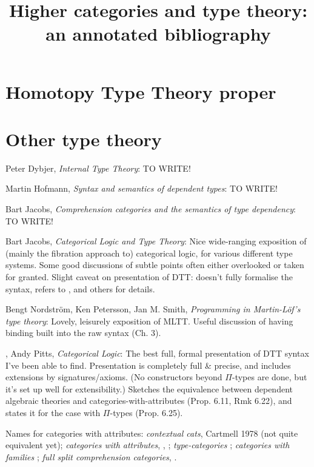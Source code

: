 \documentclass{article}
\begin{document}
\title{Higher categories and type theory: an annotated bibliography}

\section{Homotopy Type Theory proper}

\section{Other type theory}

\cite{dybjer:internal-type-theory} Peter Dybjer, \emph{Internal Type Theory}: TO WRITE!

\cite{hofmann:syntax-and-semantics} Martin Hofmann, \emph{Syntax and semantics of dependent types}: TO WRITE!

\cite{jacobs:comprehension-categories} Bart Jacobs, \emph{Comprehension categories and the semantics of type dependency}: TO WRITE!

\cite{jacobs:categorical-logic} Bart Jacobs, \emph{Categorical Logic and Type Theory}: Nice wide-ranging exposition of (mainly the fibration approach to) categorical logic, for various different type systems.  Some good discussions of subtle points often either overlooked or taken for granted.  Slight caveat on presentation of DTT: doesn't fully formalise the syntax, refers to \cite{pitts:categorical-logic}, \cite{hofmann:syntax-and-semantics} and others for details.

\cite{n-p-s:programming} Bengt Nordstr\"o{}m, Ken Petersson, Jan M. Smith, \emph{Programming in Martin-L\"o{}f's type theory}: Lovely, leisurely exposition of MLTT.  Useful discussion of having binding built into the raw syntax (Ch. 3).

\cite{pitts:categorical-logic}, Andy Pitts, \emph{Categorical Logic}: The best full, formal presentation of DTT syntax I've been able to find.  Presentation is completely full \& precise, and includes extensions by signatures/axioms.  (No constructors beyond $\Pi$-types are done, but it's set up well for extensibility.)  Sketches the equivalence between dependent algebraic theories and categories-with-attributes (Prop. 6.11, Rmk 6.22), and states it for the case with $\Pi$-types (Prop. 6.25).

Names for categories with attributes: \emph{contextual cats}, Cartmell 1978 (not quite equivalent yet); \emph{categories with attributes}, \cite{hofmann:lcccs}, \cite{hofmann:syntax-and-semantics}; \emph{type-categories} \cite{pitts:categorical-logic}; \emph{categories with families} \cite{dybjer:internal-type-theory}; \emph{full split comprehension categories}, \cite[4.10]{jacobs:comprehension-categories}.
\end{document}
